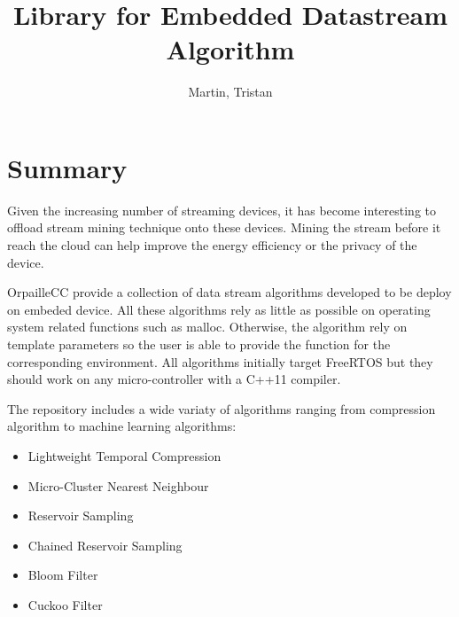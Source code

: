 \documentclass{article}
\title{Library for Embedded Datastream Algorithm}
\author{Martin, Tristan}
\begin{document}
\maketitle
\section{Summary}
Given the increasing number of streaming devices, it has become interesting to
offload stream mining technique onto these devices. Mining the stream before it
reach the cloud can help improve the energy efficiency or the privacy of the
device.

OrpailleCC provide a collection of data stream algorithms developed to be
deploy on embeded device.  All these algorithms rely as little as possible on
operating system related functions such as malloc. Otherwise, the algorithm
rely on template parameters so the user is able to provide the function for the
corresponding environment.
All algorithms initially target FreeRTOS \cite{freertos} but they should work
on any micro-controller with a C++11 compiler. 

The repository includes a wide variaty of algorithms ranging from compression
algorithm to machine learning algorithms:
\begin{itemize}
	\item Lightweight Temporal Compression \cite{ltc}
	\item Micro-Cluster Nearest Neighbour \cite{mc-nn}
	\item Reservoir Sampling \cite{reservoir_sampling}
	\item Chained Reservoir Sampling \cite{chained_reservoir_sampling}
	\item Bloom Filter \cite{bloom}
	\item Cuckoo Filter \cite{cuckoo_filter}
\end{itemize}

\end{document}
